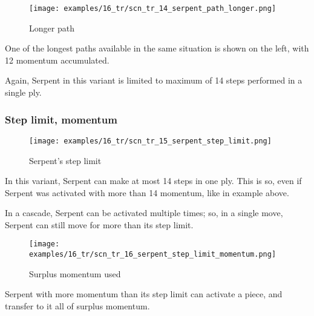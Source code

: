 \vspace*{5.7\baselineskip}
\noindent
\begin{wrapfigure}[7]{l}{0.4\textwidth}
\centering
\texttt{[image: examples/16\_tr/scn\_tr\_14\_serpent\_path\_longer.png]}
\vspace*{-0.5\baselineskip}
\caption{Longer path}
\label{fig:scn_tr_14_serpent_path_longer}
\end{wrapfigure}
One of the longest paths available in the same situation is shown on the left,
with 12 momentum accumulated.

Again, Serpent in this variant is limited to maximum of 14 steps performed in a
single ply.

\clearpage %

\subsubsection*{Step limit, momentum}
\label{sec:Tamoanchan Revisited/Serpent/Movement/Step limit, momentum}

\vspace*{-1.2\baselineskip}
\noindent
\begin{figure}[!h]
\texttt{[image: examples/16\_tr/scn\_tr\_15\_serpent\_step\_limit.png]}
\caption{Serpent's step limit}
\label{fig:scn_tr_15_serpent_step_limit}
\end{figure}

In this variant, Serpent can make at most 14 steps in one ply. This is so,
even if Serpent was activated with more than 14 momentum, like in example
above.

In a cascade, Serpent can be activated multiple times; so, in a single move,
Serpent can still move for more than its step limit.

\clearpage %

\vspace*{-2.1\baselineskip}
\noindent
\begin{figure}[!h]
\texttt{[image: examples/16\_tr/scn\_tr\_16\_serpent\_step\_limit\_momentum.png]}
\caption{Surplus momentum used}
\label{fig:scn_tr_16_serpent_step_limit_momentum}
\end{figure}

Serpent with more momentum than its step limit can activate a piece, and
transfer to it all of surplus momentum.

